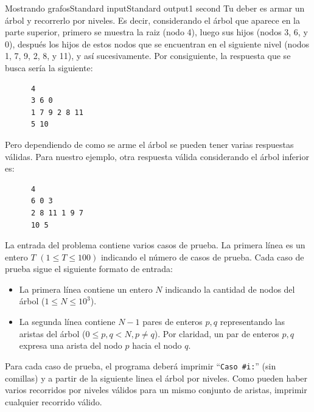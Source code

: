 \begin{problem}{Mostrando grafos}{Standard input}{Standard output}{1 second}{}
Tu deber es armar un árbol y recorrerlo por niveles. Es decir, considerando el árbol  que aparece en la parte superior, primero se muestra la raiz (nodo 4), luego sus hijos (nodos 3, 6, y 0), después los hijos de estos nodos que se encuentran en el siguiente nivel (nodos 1, 7, 9, 2, 8, y 11), y as\'i sucesivamente. Por consiguiente, la respuesta que se busca ser\'ia la siguiente:

\begin{verbatim}
      4
      3 6 0
      1 7 9 2 8 11
      5 10
\end{verbatim}

Pero dependiendo de como se arme el árbol se pueden tener varias respuestas válidas. Para nuestro ejemplo, otra respuesta válida considerando el árbol inferior es:

\begin{verbatim}
      4
      6 0 3
      2 8 11 1 9 7
      10 5
\end{verbatim}

\InputFile

La entrada del problema contiene varios casos de prueba. La primera línea es un entero $T$ $(1 \leq T \leq 100)$ indicando el número de casos de prueba. Cada caso de prueba sigue el siguiente formato de entrada:

\begin{itemize}
\item La primera línea contiene un entero $N$ indicando la cantidad de nodos del árbol ($1 \leq N \leq 10^3$).

\item La segunda línea contiene $N - 1$ pares de enteros $p, q$ representando las aristas del árbol ($0 \leq p, q < N, p\neq q$). Por claridad, un par de enteros $p, q$ expresa una arista del nodo $p$ hacia el nodo $q$.

\end{itemize}

\OutputFile
Para cada caso de prueba, el programa deber\'a imprimir ``\texttt{Caso \#i:}'' (sin comillas) y a partir de la siguiente linea el árbol por niveles. Como pueden haber varios recorridos por niveles válidos para un mismo conjunto de aristas, imprimir cualquier recorrido válido.

\Example

\begin{example}
\end{example}

\end{problem}

